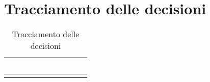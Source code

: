 
\section{Tracciamento delle decisioni}

\begin{longtable}{|C{.40\textwidth}|C{.60\textwidth}|}
\hline
{}\textbf{\textcolor{white}{Codice}} & \textbf{\textcolor{white}{Decisione}}\\
\hline \hline
\caption{Tracciamento delle decisioni}
\end{longtable}

